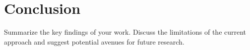\section{Conclusion}
\label{sec:conclusion}

Summarize the key findings of your work. Discuss the limitations of the current approach and suggest potential avenues for future research.
